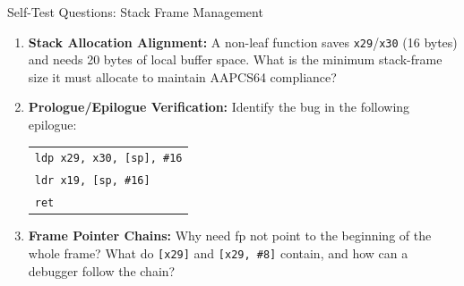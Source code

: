 \documentclass[aspectratio=169,11pt,t]{beamer}
\newcommand{\key}[1]{\textbf{#1}}
\newcommand{\bits}[1]{\texttt{#1}}
\newcommand{\code}[1]{\texttt{#1}}
\begin{document}
\begin{frame}{Self-Test Questions: Stack Frame Management}

\begin{enumerate}\setlength{\itemsep}{6pt}
  \item \key{Stack Allocation Alignment:} A non-leaf function saves \bits{x29}/\bits{x30} (16 bytes) and needs 20 bytes of local buffer space. What is the minimum stack-frame size it must allocate to maintain AAPCS64 compliance?

  \item \key{Prologue/Epilogue Verification:} Identify the bug in the following epilogue:
  \small
  \begin{tabular}{l}
  \code{ldp x29, x30, [sp], \#16} \\
  \code{ldr x19, [sp, \#16]} \\
  \code{ret} \\
  \end{tabular}

  \item \key{Frame Pointer Chains:} Why need fp not point to the beginning of the whole frame? What do \code{[x29]} and \code{[x29, \#8]} contain, and how can a debugger follow the chain?
\end{enumerate}

\end{frame}
\end{document}
